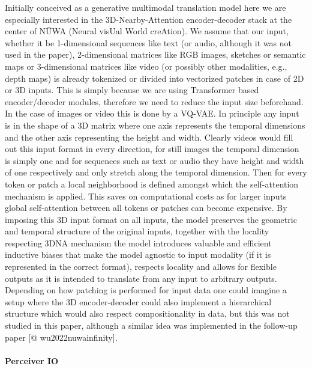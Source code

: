 \documentclass[
]{krantz}
\begin{document}
Initially conceived as a generative multimodal translation model here we are especially interested in the 3D-Nearby-Attention encoder-decoder stack at the center of NÜWA (Neural visUal World creAtion). We assume that our input, whether it be 1-dimensional sequences like text (or audio, although it was not used in the paper), 2-dimensional matrices like RGB images, sketches or semantic maps or 3-dimensional matrices like video (or possibly other modalities, e.g., depth maps) is already tokenized or divided into vectorized patches in case of 2D or 3D inputs. This is simply because we are using Transformer based encoder/decoder modules, therefore we need to reduce the input size beforehand. In the case of images or video this is done by a VQ-VAE. In principle any input is in the shape of a 3D matrix where one axis represents the temporal dimensions and the other axis representing the height and width. Clearly videos would fill out this input format in every direction, for still images the temporal dimension is simply one and for sequences such as text or audio they have height and width of one respectively and only stretch along the temporal dimension. Then for every token or patch a local neighborhood is defined amongst which the self-attention mechanism is applied. This saves on computational costs as for larger inputs global self-attention between all tokens or patches can become expensive. By imposing this 3D input format on all inputs, the model preserves the geometric and temporal structure of the original inputs, together with the locality respecting 3DNA mechanism the model introduces valuable and efficient inductive biases that make the model agnostic to input modality (if it is represented in the correct format), respects locality and allows for flexible outputs as it is intended to translate from any input to arbitrary outputs. Depending on how patching is performed for input data one could imagine a setup where the 3D encoder-decoder could also implement a hierarchical structure which would also respect compositionality in data\citep{kahatapitiya2021swat}, but this was not studied in this paper, although a similar idea was implemented in the follow-up paper \citep{wu2021nwa}{[}@ wu2022nuwainfinity{]}.

\hypertarget{perceiver-io}{%
\paragraph{Perceiver IO}\label{perceiver-io}}
\end{document}
